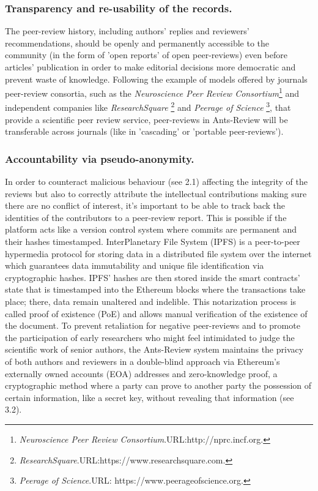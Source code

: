 \documentclass[runningheads]{llncs}
\begin{document}
\subsubsection{Transparency and re-usability of the records.} The peer-review history, including authors' replies and reviewers' recommendations, should be openly and permanently accessible to the community (in the form of 'open reports' of open peer-reviews) even before articles' publication in order to  make editorial decisions more democratic and prevent waste of knowledge. Following the example of models offered by journals peer-review consortia, such as the \emph{Neuroscience Peer Review Consortium}\footnote[4]{\emph{Neuroscience Peer Review Consortium}.\textsc{URL:}http://nprc.incf.org.} and independent companies like \emph{ResearchSquare} \footnote[5]{\emph{ResearchSquare}.\textsc{URL:}https://www.researchsquare.com.} and \emph{Peerage of Science} \footnote[6]{\emph{Peerage of Science}.\textsc{URL:} https://www.peerageofscience.org.}, that provide a scientific peer review service, peer-reviews in Ants-Review will be transferable across journals (like in 'cascading' or 'portable peer-reviews').

\subsubsection{Accountability via pseudo-anonymity.} In order to counteract malicious behaviour (see 2.1) affecting the integrity of the reviews but also to correctly attribute the intellectual contributions making sure there are no conflict of interest, it's important to be able to track back the identities of the contributors to a peer-review report. This is possible if the platform acts like a version control system where commits are permanent and their hashes timestamped. InterPlanetary File System (IPFS) \cite{IPFS} is a peer-to-peer hypermedia protocol for storing data in a distributed file system over the internet which guarantees data immutability and unique file identification via cryptographic hashes. IPFS' hashes are then stored inside the smart contracts' state that is timestamped into the Ethereum blocks where  the transactions take place; there, data remain unaltered and indelible. This notarization process is called proof of existence (PoE) and allows manual verification of the existence of the document.
\newline To prevent retaliation for negative peer-reviews and to promote the participation of early researchers who might feel intimidated to judge the scientific work of senior authors, the Ants-Review system maintains the privacy of both authors and reviewers in a double-blind approach via Ethereum’s externally owned accounts (EOA) addresses and zero-knowledge proof, a cryptographic method where a party can prove to another party the possession of certain information, like a secret key, without revealing that information (see 3.2).
\end{document}
